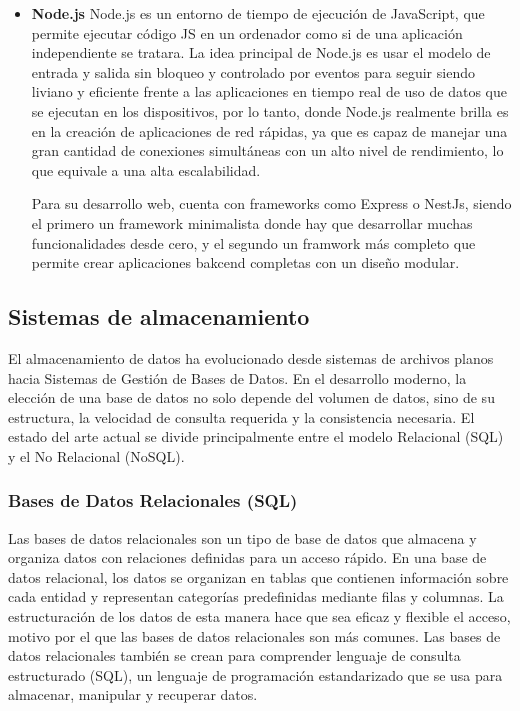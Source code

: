 \begin{itemize}
    \item \textbf{Node.js} \cite{nodeJs}
    \newline
    Node.js es un entorno de tiempo de ejecución de JavaScript, que permite ejecutar código JS en un ordenador como si de
    una aplicación independiente se tratara. La idea principal de Node.js es usar el modelo de entrada y salida sin 
    bloqueo y controlado por eventos para seguir siendo liviano y eficiente frente a las aplicaciones en tiempo real 
    de uso de datos que se ejecutan en los dispositivos, por lo tanto, donde Node.js realmente brilla es en la 
    creación de aplicaciones de red rápidas, ya que es capaz de manejar una gran cantidad de conexiones simultáneas 
    con un alto nivel de rendimiento, lo que equivale a una alta escalabilidad.

    Para su desarrollo web, cuenta con frameworks como Express o NestJs, siendo el primero un framework minimalista
    donde hay que desarrollar muchas funcionalidades desde cero, y el segundo un framwork más completo que permite 
    crear aplicaciones bakcend completas con un diseño modular. 
\end{itemize}

\subsection{Sistemas de almacenamiento}

El almacenamiento de datos ha evolucionado desde sistemas de archivos planos hacia Sistemas de Gestión de Bases de Datos. 
En el desarrollo moderno, la elección de una base de datos no solo depende del volumen de datos, sino de su estructura, 
la velocidad de consulta requerida y la consistencia necesaria. El estado del arte actual se divide principalmente entre 
el modelo Relacional (SQL) y el No Relacional (NoSQL).

\subsubsection{Bases de Datos Relacionales (SQL) \cite{baseDatosSQL}} 

Las bases de datos relacionales son un tipo de base de datos que almacena y organiza datos con relaciones definidas para 
un acceso rápido. En una base de datos relacional, los datos se organizan en tablas que contienen información sobre cada 
entidad y representan categorías predefinidas mediante filas y columnas. La estructuración de los datos de esta manera 
hace que sea eficaz y flexible el acceso, motivo por el que las bases de datos relacionales son más comunes. Las bases 
de datos relacionales también se crean para comprender lenguaje de consulta estructurado (SQL), un lenguaje de 
programación estandarizado que se usa para almacenar, manipular y recuperar datos.

